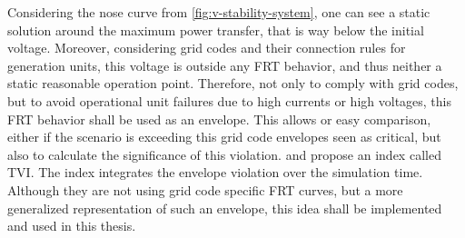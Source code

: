 Considering the nose curve from \autoref{fig:v-stability-system}, one can see a static solution around the maximum power transfer, that is way below the initial voltage.
Moreover, considering grid codes and their connection rules for generation units, this voltage is outside any \ac{FRT} behavior, and thus neither a static reasonable operation point.
Therefore, not only to comply with grid codes, but to avoid operational unit failures due to high currents or high voltages, this \acs{FRT} behavior shall be used as an envelope.
This allows or easy comparison, either if the scenario is exceeding this grid code envelopes seen as critical, but also to calculate the significance of this violation.
\textcite{scheiner_2022} and \textcite{wildenhues_2015} propose an index called \acf{TVI}.
The index integrates the envelope violation over the simulation time.
Although they are not using grid code specific \acs{FRT} curves, but a more generalized representation of such an envelope, this idea shall be implemented and used in this thesis.

